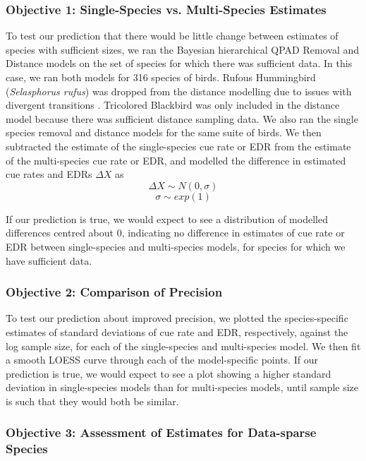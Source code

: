 \documentclass[12pt]{article}
\begin{document}
\subsubsection{Objective 1: Single-Species vs. Multi-Species Estimates}
\par To test our prediction that there would be little change between estimates of species with sufficient sizes, we ran the Bayesian hierarchical QPAD Removal and Distance models on the set of species for which there was sufficient data.
In this case, we ran both models for 316 species of birds.
Rufous Hummingbird (\textit{Selasphorus rufus}) was dropped from the distance modelling due to issues with divergent transitions \citep{betancourt_diagnosing_2016, leimkuhler_simulating_2005}.
Tricolored Blackbird was only included in the distance model because there was sufficient distance sampling data.
We also ran the single species removal and distance models for the same suite of birds.
We then subtracted the estimate of the single-species cue rate or EDR from the estimate of the multi-species cue rate or EDR, and modelled the difference in estimated cue rates and EDRs $\Delta X$ as
$$\Delta X \sim N(0,\sigma)$$
$$\sigma \sim exp(1)$$

If our prediction is true, we would expect to see a distribution of modelled differences centred about 0, indicating no difference in estimates of cue rate or EDR between single-species and multi-species models, for species for which we have sufficient data.

\subsubsection{Objective 2: Comparison of Precision}
\par To test our prediction about improved precision, we plotted the species-specific estimates of standard deviations of cue rate and EDR, respectively, against the log sample size, for each of the single-species and multi-species model.
We then fit a smooth LOESS curve through each of the model-specific points.
If our prediction is true, we would expect to see a plot showing a higher standard deviation in single-species models than for multi-species models, until sample size is such that they would both be similar.

\subsubsection{Objective 3: Assessment of Estimates for Data-sparse Species}
\end{document}

